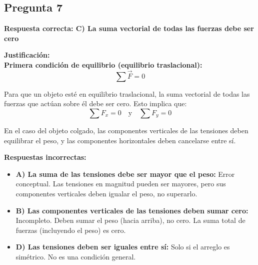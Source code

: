 \begin{respuestabox}

\subsection{Pregunta 7}
\textcolor{verdecorrecto}{\textbf{Respuesta correcta: C) La suma vectorial de todas las fuerzas debe ser cero}}

\textbf{Justificación:}\\
\textbf{Primera condición de equilibrio (equilibrio traslacional):}
$$\sum \vec{F} = 0$$

Para que un objeto esté en equilibrio traslacional, la suma vectorial de todas las fuerzas que actúan sobre él debe ser cero. Esto implica que:
$$\sum F_x = 0 \quad \text{y} \quad \sum F_y = 0$$

En el caso del objeto colgado, las componentes verticales de las tensiones deben equilibrar el peso, y las componentes horizontales deben cancelarse entre sí.

\textbf{Respuestas incorrectas:}
\begin{itemize}
    \item \textbf{A) La suma de las tensiones debe ser mayor que el peso:} Error conceptual. Las tensiones en magnitud pueden ser mayores, pero sus componentes verticales deben igualar el peso, no superarlo.
    \item \textbf{B) Las componentes verticales de las tensiones deben sumar cero:} Incompleto. Deben sumar el peso (hacia arriba), no cero. La suma total de fuerzas (incluyendo el peso) es cero.
    \item \textbf{D) Las tensiones deben ser iguales entre sí:} Solo si el arreglo es simétrico. No es una condición general.
\end{itemize}
\end{respuestabox}

